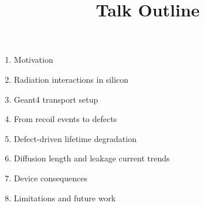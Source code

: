 \documentclass[11pt]{article}
\title{Talk Outline}
\begin{document}
\maketitle

\begin{enumerate}
    \item Motivation
    \item Radiation interactions in silicon
    \item Geant4 transport setup
    \item From recoil events to defects
    \item Defect-driven lifetime degradation
    \item Diffusion length and leakage current trends
    \item Device consequences
    \item Limitations and future work
\end{enumerate}
\end{document}
